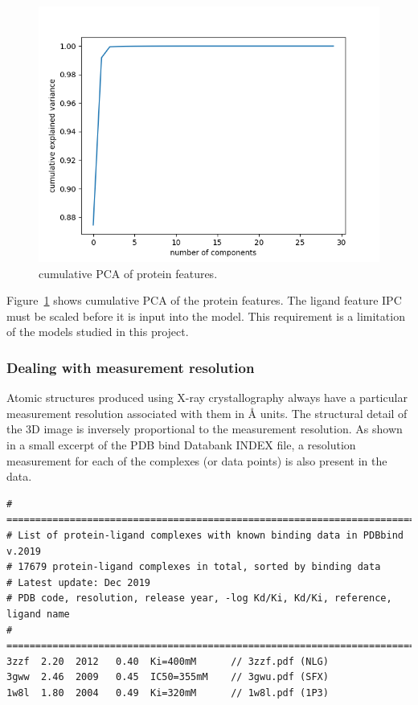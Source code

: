 \documentclass[11pt]{article}
\begin{document}
\begin{figure}[htb]
  \centering
    \includegraphics[scale=0.7]{images/pcaproteinanalysis}
    \caption{cumulative PCA of protein features.}
    \label{fig:pcaproteinanalysis}
\end{figure}

Figure~\ref{fig:pcaproteinanalysis} shows cumulative PCA of the protein features. The ligand feature IPC must be scaled before it is input into the model. This requirement is a limitation of the models studied in this project.

\subsubsection{Dealing with measurement resolution}
Atomic structures produced using X-ray crystallography always have a particular measurement resolution associated with them in \si{\angstrom} units. The structural detail of the 3D image is inversely proportional to the measurement resolution.
As shown in a small excerpt of the PDB bind Databank INDEX file, a resolution measurement for each of the complexes (or data points) is also present in the data.


\begin{verbatim}
# ==============================================================================
# List of protein-ligand complexes with known binding data in PDBbind v.2019
# 17679 protein-ligand complexes in total, sorted by binding data
# Latest update: Dec 2019
# PDB code, resolution, release year, -log Kd/Ki, Kd/Ki, reference, ligand name
# ==============================================================================
3zzf  2.20  2012   0.40  Ki=400mM      // 3zzf.pdf (NLG)
3gww  2.46  2009   0.45  IC50=355mM    // 3gwu.pdf (SFX)
1w8l  1.80  2004   0.49  Ki=320mM      // 1w8l.pdf (1P3)
\end{verbatim}
\end{document}
